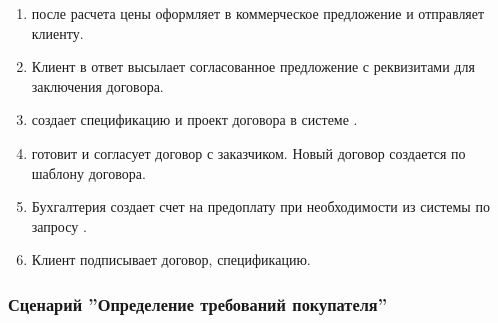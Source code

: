 \begin{enumerate}
\item	\manager после расчета цены оформляет в  коммерческое предложение и отправляет клиенту.

\item Клиент в ответ высылает \manager  согласованное предложение с реквизитами для заключения договора. 
\item	\manager создает спецификацию и проект договора в системе \erp.

\item \manager готовит и согласует договор с заказчиком. Новый договор создается по шаблону договора.


\item Бухгалтерия создает счет на предоплату при необходимости из системы \erp по запросу \manager.

\item Клиент подписывает договор, спецификацию. %
\end{enumerate}



\subsubsection{Сценарий ''Определение требований покупателя''}
\label{bp:sales_3}

